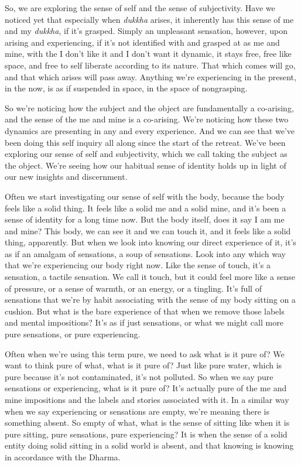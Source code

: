 \documentclass[12pt,openany]{book}
\begin{document}
So, we are exploring the sense of self and the sense of subjectivity. Have we noticed yet that especially when \textit{dukkha} arises, it inherently has this sense of me and my \textit{dukkha}, if it’s grasped. Simply an unpleasant sensation, however, upon arising and experiencing, if it's not identified with and grasped at as me and mine, with the I don’t like it and I don’t want it dynamic, it stays free, free like space, and free to self liberate according to its nature. That which comes will go, and that which arises will pass away. Anything we're experiencing in the present, in the now, is as if suspended in space, in the space of nongrasping. 

So we're noticing how the subject and the object are fundamentally a co-arising, and the sense of the me and mine is a co-arising. We're noticing how these two dynamics are presenting in any and every experience. And we can see that we've been doing this self inquiry all along since the start of the retreat. We've been exploring our sense of self and subjectivity, which we call taking the subject as the object. We're seeing how our habitual sense of identity holds up in light of our new insights and discernment.

Often we start investigating our sense of self with the body, because the body feels like a solid thing. It feels like a solid me and a solid mine, and it's been a sense of identity for a long time now. But the body itself, does it say I am me and mine? This body, we can see it and we can touch it, and it feels like a solid thing, apparently. But when we look into knowing our direct experience of it, it's as if an amalgam of sensations,  a soup of sensations. Look into any which way that we're experiencing our body right now. Like the sense of touch, it’s a sensation, a tactile sensation. We call it touch, but it could feel more like a sense of pressure, or a sense of warmth, or an energy, or a tingling. It's full of sensations that we’re by habit associating with the sense of my body sitting on a cushion. But what is the bare experience of that when we remove those labels and mental impositions? It’s as if just sensations, or what we might call more pure sensations, or pure experiencing. 

Often when we're using this term pure, we need to ask what is it pure of? We want to think pure of what, what is it pure of? Just like pure water, which is pure because it's not contaminated, it’s not polluted. So when we say pure sensations or experiencing, what is it pure of? It's actually pure of the me and mine impositions and the labels and stories associated with it. In a similar way when we say experiencing or sensations are empty, we're meaning there is something absent. So empty of what, what is the sense of sitting like when it is pure sitting, pure sensations, pure experiencing? It is when the sense of a solid entity doing solid sitting in a solid world is absent, and that knowing is knowing in accordance with the Dharma. 
\end{document}
